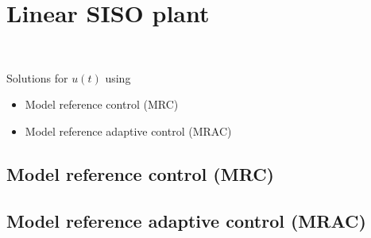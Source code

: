 \section{Linear SISO plant}
~

Solutions for $u(t)$ using
\begin{itemize}
\item Model reference control (MRC)
\item Model reference adaptive control (MRAC)
\end{itemize}

\subsection{Model reference control (MRC)}


\subsection{Model reference adaptive control (MRAC)}


